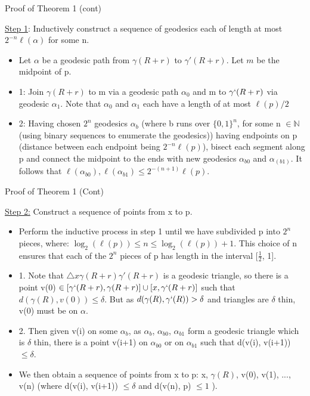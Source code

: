 \documentclass[11pt]{beamer}
\begin{document}
	\begin{frame}{Proof of Theorem 1 (cont)}
		
		\underline{Step 1}: Inductively construct a sequence of geodesics each of length at most $2^{-n} \ell(\alpha)$ for some n.
		
		\begin{itemize}
			\item Let $\alpha$ be a geodesic path from $\gamma(R+r)$ to $\gamma'(R+r)$. Let $m$ be the midpoint of p. 
			
			\item 1: Join $\gamma(R+r)$ to m via a geodesic path $\alpha_0$ and m to $\gamma`(R+r)$ via geodesic $\alpha_1$. Note that $\alpha_0$ and $\alpha_1$ each have a length of at most $\ell(p)/2$
			
			\item 2: Having chosen $2^n$ geodesics $\alpha_b$ (where b runs over $\{0,1\}^n$, for some n $\in \mathbb{N}$ (using binary sequences to enumerate the geodesics)) having endpoints on p (distance between each endpoint being $2^{-n}\ell(p)$), bisect each segment along p and connect the midpoint to the ends with new geodesics $\alpha_{b0}$ and $\alpha_(b1)$. It follows that $\ell(\alpha_{b0}),\ell(\alpha_{b1}) \leq 2^{-(n+1)}\ell(p)$.
		\end{itemize}
		
	\end{frame}
		\begin{frame}{Proof of Theorem 1 (Cont)}
		
		\underline{Step 2:} Construct a sequence of points from x to p.
		
		\begin{itemize}
			\item Perform the inductive process in step 1 until we have subdivided p into $2^n$ pieces, where: $\log_2(\ell(p)) \leq n \leq \log_2(\ell(p)) + 1$. This choice of n ensures that each of the $2^n$ pieces of p has length in the interval [$\frac{1}{2}$, 1].
			\item 1. Note that $\triangle x \gamma(R+r) \gamma'(R+r)$ is a geodesic triangle, so there is a point v(0) $\in [\gamma`(R+r), \gamma(R+r)] \cup [x, \gamma`(R+r)]$ such that $d(\gamma(R), v(0)) \leq \delta$. But as $d(\gamma(R), \gamma`(R)) > \delta $ and triangles are $\delta$ thin, v(0) must be on $\alpha$. 
			\item 2. Then given v(i) on some $\alpha_{b}$, as $\alpha_{b}$, $\alpha_{b0}$, $\alpha_{b1}$ form a geodesic triangle which is $\delta $ thin, there is a point v(i+1) on $\alpha_{b0}$ or on $\alpha_{b1}$ such that d(v(i), v(i+1)) $\leq \delta$. 
			\item We then obtain a sequence of points from x to p: x, $\gamma(R)$, v(0), v(1), ..., v(n) (where d(v(i), v(i+1)) $\leq \delta$ and d(v(n), p) $\leq 1$ ). 
		\end{itemize}
		
	\end{frame}
\end{document}
